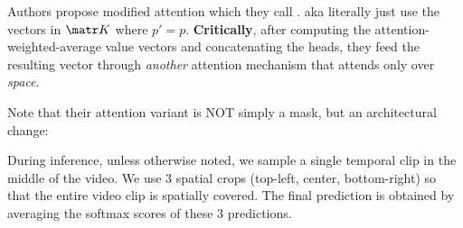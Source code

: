 \documentclass[11pt]{article}
\begin{document}
Authors propose modified attention which they call . 
aka literally just use the vectors in $\matr K$ where $p'=p$. \textbf{Critically}, after computing the attention-weighted-average value vectors and concatenating the heads, they feed the resulting vector through \textit{another} attention mechanism that attends only over \textit{space}.


Note that their attention variant is NOT simply a mask, but an architectural change:

\begin{myquote}
	During inference, unless otherwise noted, we sample a single temporal clip in the middle of the video. We use 3 spatial crops (top-left, center, bottom-right) so that the entire video clip is spatially covered. The final prediction is obtained by averaging the softmax scores of these 3 predictions.
\end{myquote}




























\label{Vision and Language}
\end{document}
